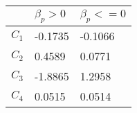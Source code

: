     \begin{tabular}{l l l}
\toprule
 & 

\(\beta_p>0\)
& 

\(\beta_p<=0\)
\\
\hline

\(C_1\)
&

-0.1735
&

-0.1066
\\


\(C_2\)
&

0.4589
&

0.0771
\\


\(C_3\)
&

-1.8865
&

1.2958
\\


\(C_4\)
&

0.0515
&

0.0514
\\
\bottomrule
\end{tabular}


